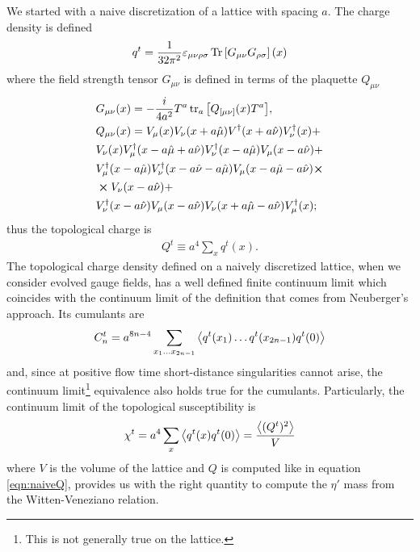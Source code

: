 We started with a naive discretization of a lattice with spacing $a$. The charge density is defined
\begin{align}
  q ^{t}= \frac{1}{32\pi ^2}\varepsilon_{\mu\nu\rho\sigma}\Tr\qty[G_{\mu\nu}G_{\rho\sigma}](x)
\end{align}
where the field strength tensor $G_{\mu\nu}$ is defined in terms of the plaquette $Q_{\mu\nu}$
\begin{align}
  &G_{\mu\nu}(x)=- \frac{i}{4a ^2}T ^{a}\tr_{a}\qty[Q_{[\mu\nu]}(x)T ^{a}], \\
  &Q_{\mu\nu}(x) = V_{\mu}(x)V_{\nu}(x+a\hat{\mu})V ^{\dagger}(x+a\hat{\nu})V_{\nu}^{\dagger}(x) + \notag\\
  &V_{\nu}(x)V_{\mu}^{\dagger}(x-a\hat{\mu}+a\hat{\nu})V ^{\dagger}_{\nu}(x-a\hat{\mu})V_{\mu}(x-a\hat{\nu})+ \notag\\
  &V ^{\dagger}_{\mu}(x-a\hat{\mu})V_{\nu}^{\dagger}(x-a\hat{\nu}-a\hat{\mu})V_{\mu}(x-a\hat\mu-a\hat\nu)\cp \notag\\
 &\cp V_{\nu}(x-a\hat\nu) +\notag\\
  &V_{\nu}^{\dagger}(x-a\hat\nu)V_{\mu}(x-a\hat\nu)V_{\nu}(x+a\hat\mu-a\hat\nu)V_{\mu}^{\dagger}(x);
\end{align}
thus the topological charge is
\begin{align}
  \label{eqn:naiveQ}
  Q ^{t}\equiv a ^{4} \sum_{x}q ^{t}(x).
\end{align}
The topological charge density defined on a naively discretized lattice, when we consider
evolved gauge fields, has a well defined finite continuum limit which coincides with the continuum limit of the definition that comes from Neuberger's approach. Its cumulants are
\begin{align}
  C_{n}^{t} = a ^{8n-4} \sum_{x_{1}\dots x_{2n-1}}\ev{q ^{t}(x_{1})\dots q ^{t}(x_{2n-1}) q ^{t}(0)}
\end{align}
and, since at positive flow time short-distance singularities cannot arise, the continuum limit\footnote{This is not generally true on the lattice.} equivalence also holds true for the cumulants.
Particularly, the continuum limit of the topological susceptibility is
\begin{align}
  \chi ^{t}=a ^{4}\sum_{x}\ev{q ^{t}(x) q ^{t}(0)} = \frac{\ev{(Q ^{t})^{2}}}{V}
\end{align}
where $V$ is the volume of the lattice and $Q$ is computed like in equation \ref{eqn:naiveQ}, provides us with the right quantity to compute the $\eta'$ mass from the Witten-Veneziano relation.

